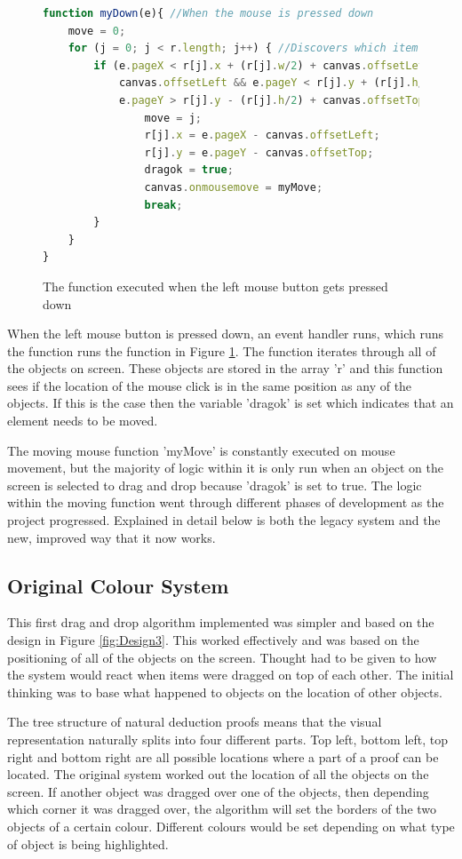 \begin{figure}[H]
\begin{lstlisting}[language=JavaScript]
function myDown(e){ //When the mouse is pressed down
	move = 0;
	for (j = 0; j < r.length; j++) { //Discovers which item is pressed down.
		if (e.pageX < r[j].x + (r[j].w/2) + canvas.offsetLeft && e.pageX > r[j].x - (r[j].w/2) +
			canvas.offsetLeft && e.pageY < r[j].y + (r[j].h/2) + canvas.offsetTop &&
			e.pageY > r[j].y - (r[j].h/2) + canvas.offsetTop){
				move = j;
				r[j].x = e.pageX - canvas.offsetLeft;
				r[j].y = e.pageY - canvas.offsetTop;
				dragok = true;
				canvas.onmousemove = myMove;
				break;
		}
	}
}
\end{lstlisting}
\caption{The function executed when the left mouse button gets pressed down}
\label{fig:myDown}
\end{figure}

When the left mouse button is pressed down, an event handler runs, which runs the function runs the function in Figure \ref{fig:myDown}. The function iterates through all of the objects on screen. These objects are stored in the array 'r' and this function sees if the location of the mouse click is in the same position as any of the objects. If this is the case then the variable 'dragok' is set which indicates that an element needs to be moved. 

The moving mouse function 'myMove' is constantly executed on mouse movement, but the majority of logic within it is only run when an object on the screen is selected to drag and drop because 'dragok' is set to true. The logic within the moving function went through different phases of development as the project progressed. Explained in detail below is both the legacy system and the new, improved way that it now works.

\subsection{Original Colour System}

This first drag and drop algorithm implemented was simpler and based on the design in Figure \ref{fig:Design3}. This worked effectively and was based on the positioning of all of the objects on the screen. Thought had to be given to how the system would react when items were dragged on top of each other. The initial thinking was to base what happened to objects on the location of other objects. 

The tree structure of natural deduction proofs means that the visual representation naturally splits into four different parts. Top left, bottom left, top right and bottom right are all possible locations where a part of a proof can be located. The original system worked out the location of all the objects on the screen. If another object was dragged over one of the objects, then depending which corner it was dragged over, the algorithm will set the borders of the two objects of a certain colour. Different colours would be set depending on what type of object is being highlighted. 

